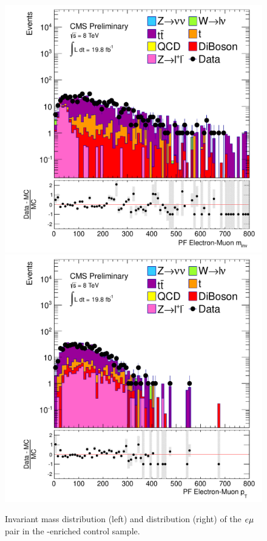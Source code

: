 \begin{figure}[htbp!]
\begin{center}
  \includegraphics[scale=0.35]{Figures/sus13009/PFElecMuonMass.pdf} 
    \includegraphics[scale=0.35]{Figures/sus13009/PFElecMuonPt.pdf}
\caption{Invariant mass distribution (left) and \pt{} distribution (right) of the $e\mu$ pair in the \ttbar-enriched control sample.}
\label{ttbar}
\end{center}
\end{figure}



